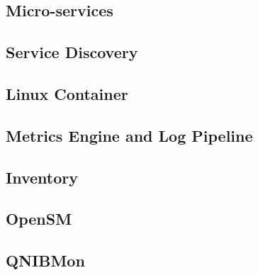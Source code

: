 \subsection{Micro-services}



\subsection{Service Discovery}


\subsection{Linux Container}


\subsection{Metrics Engine and Log Pipeline}




\subsection{Inventory}


\subsection{OpenSM}


\subsection{QNIBMon}
